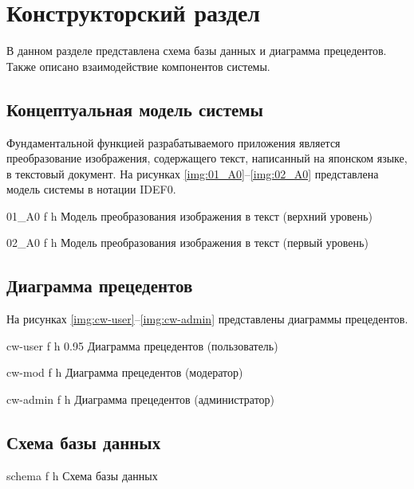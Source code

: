 \chapter{Конструкторский раздел}

В данном разделе представлена схема базы данных и диаграмма прецедентов. Также описано взаимодействие компонентов системы.

\section{Концептуальная модель системы}

Фундаментальной функцией разрабатываемого приложения является преобразование изображения, содержащего текст, написанный на японском языке, в текстовый документ. На рисунках \ref{img:01_A0}--\ref{img:02_A0} представлена модель системы в нотации IDEF0.

    {01_A0}
    {f}
    {h}
    {\linewidth}
    {Модель преобразования изображения в текст (верхний уровень)}

\clearpage

    {02_A0}
    {f}
    {h}
    {\linewidth}
    {Модель преобразования изображения в текст (первый уровень)}

\section{Диаграмма прецедентов}

На рисунках \ref{img:cw-user}--\ref{img:cw-admin} представлены диаграммы прецедентов.

    {cw-user}
    {f}
    {h}
    {0.95\linewidth}
    {Диаграмма прецедентов (пользователь)}

    {cw-mod}
    {f}
    {h}
    {\linewidth}
    {Диаграмма прецедентов (модератор)}

    {cw-admin}
    {f}
    {h}
    {\linewidth}
    {Диаграмма прецедентов (администратор)}

\clearpage

\section{Схема базы данных}

    {schema}
    {f}
    {h}
    {\linewidth}
    {Схема базы данных}
